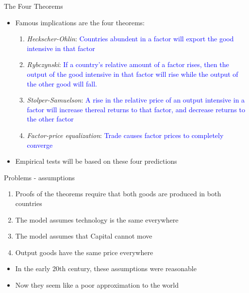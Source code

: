 \documentclass[ignorenonframetext,]{beamer}
\begin{document}
\begin{frame}{The Four Theorems}

    \begin{itemize}
        \item Famous implications are the four theorems:
        \begin{enumerate}
            \item \emph{Heckscher-Ohlin}: \textcolor{blue}{Countries abundent in a factor will export the good intensive in that factor} 
            \item \emph{Rybczynski}: \textcolor{blue}{If a country's relative amount of a factor rises, then the output of the good intensive in that factor will rise while the output of the other good will fall.}
            \item \emph{Stolper-Samuelson}: \textcolor{blue}{A rise in the relative price of an output intensive in a factor will increase thereal returns to that factor, and decrease returns to the other factor}
            \item \emph{Factor-price equalization}: \textcolor{blue}{Trade causes factor prices to completely converge}
        \end{enumerate}
        \item Empirical tests will be based on these four predictions
    \end{itemize}

\end{frame}

\begin{frame}{Problems - assumptions}

    \begin{enumerate}
        \item Proofs of the theorems require that both goods are produced in both countries
        \item The model assumes technology is the same everywhere
        \item The model assumes that Capital cannot move
        \item Output goods have the same price everywhere
    \end{enumerate}
    \begin{itemize}
        \item In the early 20th century, these assumptions were reasonable
        \item Now they seem like a poor approximation to the world
    \end{itemize} 
\end{frame}
\end{document}
